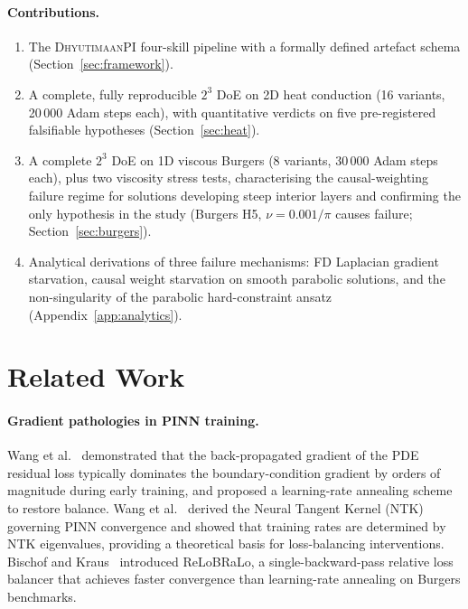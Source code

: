 \documentclass{article}
\newcommand{\dhyutimaan}{\textsc{DhyutimaanPI}}
\begin{document}
\paragraph{Contributions.}
\begin{enumerate}
  \item The \dhyutimaan{} four-skill pipeline with a formally defined artefact
        schema (Section~\ref{sec:framework}).
  \item A complete, fully reproducible $2^3$ DoE on 2D heat conduction (16
        variants, 20\,000 Adam steps each), with quantitative verdicts on five
        pre-registered falsifiable hypotheses (Section~\ref{sec:heat}).
  \item A complete $2^3$ DoE on 1D viscous Burgers (8 variants, 30\,000 Adam
        steps each), plus two viscosity stress tests, characterising the
        causal-weighting failure regime for solutions developing steep interior
        layers and confirming the only hypothesis in the study (Burgers H5,
        $\nu=0.001/\pi$ causes failure; Section~\ref{sec:burgers}).
  \item Analytical derivations of three failure mechanisms: FD Laplacian
        gradient starvation, causal weight starvation on smooth parabolic
        solutions, and the non-singularity of the parabolic hard-constraint
        ansatz (Appendix~\ref{app:analytics}).
\end{enumerate}

\section{Related Work}
\label{sec:related}

\paragraph{Gradient pathologies in PINN training.}
Wang et al.~\citep{wang2021gradpath} demonstrated that the back-propagated
gradient of the PDE residual loss typically dominates the boundary-condition
gradient by orders of magnitude during early training, and proposed a
learning-rate annealing scheme to restore balance.
Wang et al.~\citep{wang2021ntk} derived the Neural Tangent Kernel (NTK)
governing PINN convergence and showed that training rates are determined by
NTK eigenvalues, providing a theoretical basis for loss-balancing interventions.
Bischof and Kraus~\citep{bischof2021relobralo} introduced ReLoBRaLo, a
single-backward-pass relative loss balancer that achieves faster convergence
than learning-rate annealing on Burgers benchmarks.
\end{document}
